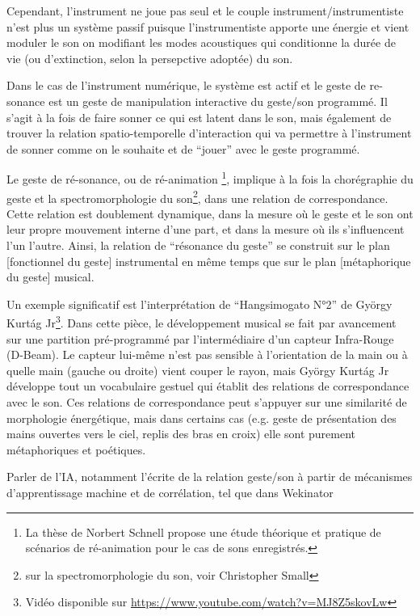 Cependant, l'instrument ne joue pas seul et le couple instrument/instrumentiste n'est plus un système passif puisque l'instrumentiste apporte une énergie et vient moduler le son on modifiant les modes acoustiques qui conditionne la durée de vie (ou d'extinction, selon la persepctive adoptée) du son.

Dans le cas de l'instrument numérique, le système est actif et le geste de re-sonance est un geste de manipulation interactive du geste/son programmé.
Il s'agit à la fois de faire sonner ce qui est latent dans le son, mais également de trouver la relation spatio-temporelle d'interaction qui va permettre à l'instrument de sonner comme on le souhaite et de ``jouer'' avec le geste programmé.

Le geste de ré-sonance, ou de ré-animation \footnote{La thèse de Norbert Schnell \cite{schnell_playing_2013} propose une étude théorique et pratique de scénarios de ré-animation pour le cas de sons enregistrés.}, implique à la fois la chorégraphie du geste et la spectromorphologie du son\footnote{sur la spectromorphologie du son, voir Christopher Small}, dans une relation de correspondance. Cette relation est doublement dynamique, dans la mesure où le geste et le son ont leur propre mouvement interne d'une part, et dans la mesure où ils s'influencent l'un l'autre. Ainsi, la relation de ``résonance du geste'' se construit sur le plan [fonctionnel du geste] instrumental en même temps que sur le plan [métaphorique du geste] musical.

Un exemple significatif est l'interprétation de ``Hangsimogato N°2'' de György Kurtág Jr\footnote{Vidéo disponible sur \url{https://www.youtube.com/watch?v=MJ8Z5skovLw}}. Dans cette pièce, le développement musical se fait par avancement sur une partition pré-programmé par l'intermédiaire d'un capteur Infra-Rouge (D-Beam). Le capteur lui-même n'est pas sensible à l'orientation de la main ou à quelle main (gauche ou droite) vient couper le rayon, mais György Kurtág Jr développe tout un vocabulaire gestuel qui établit des relations de correspondance avec le son. Ces relations de correspondance peut s'appuyer sur une similarité de morphologie énergétique, mais dans certains cas (e.g. geste de présentation des mains ouvertes vers le ciel, replis des bras en croix) elle sont purement métaphoriques et poétiques.


Parler de l'IA, notamment l'écrite de la relation geste/son à partir de mécanismes d'apprentissage machine et de corrélation, tel que dans Wekinator

